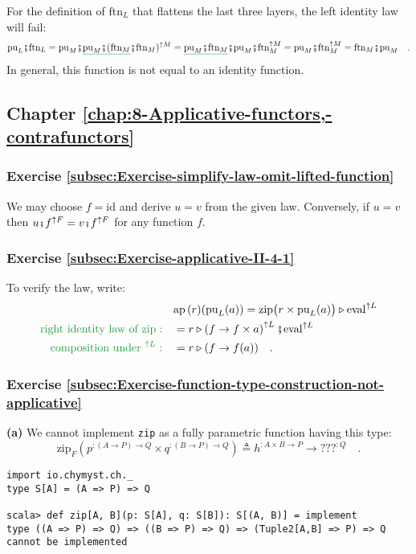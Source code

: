 For the definition of $\text{ftn}_{L}$ that flattens the last three
layers, the left identity law will fail:
\[
\text{pu}_{L}\bef\text{ftn}_{L}=\text{pu}_{M}\bef\gunderline{\text{pu}_{M}\bef(\text{ftn}_{M}}\bef\text{ftn}_{M})^{\uparrow M}=\gunderline{\text{pu}_{M}\bef\text{ftn}_{M}}\bef\text{pu}_{M}\bef\text{ftn}_{M}^{\uparrow M}=\text{pu}_{M}\bef\text{ftn}_{M}^{\uparrow M}=\text{ftn}_{M}\bef\text{pu}_{M}\quad.
\]
In general, this function is not equal to an identity function.

\subsection*{Chapter \ref{chap:8-Applicative-functors,-contrafunctors}}

\subsubsection*{Exercise \ref{subsec:Exercise-simplify-law-omit-lifted-function}}

We may choose $f=\text{id}$ and derive $u=v$ from the given law.
Conversely, if $u=v$ then $u\bef f^{\uparrow F}=v\bef f^{\uparrow F}$
for any function $f$.

\subsubsection*{Exercise \ref{subsec:Exercise-applicative-II-4-1}}

To verify the law, write:
\begin{align*}
 & \text{ap}\,(r)(\text{pu}_{L}(a))=\text{zip}\big(r\times\text{pu}_{L}(a)\big)\triangleright\text{eval}^{\uparrow L}\\
{\color{greenunder}\text{right identity law of }\text{zip}:}\quad & =r\triangleright\left(f\rightarrow f\times a\right)^{\uparrow L}\bef\text{eval}^{\uparrow L}\\
{\color{greenunder}\text{composition under }^{\uparrow L}:}\quad & =r\triangleright(f\rightarrow f(a))\quad.
\end{align*}


\subsubsection*{Exercise \ref{subsec:Exercise-function-type-construction-not-applicative}}

\textbf{(a)} We cannot implement \lstinline!zip! as a fully parametric
function having this type:
\[
\text{zip}_{F}(p^{:(A\rightarrow P)\rightarrow Q}\times q^{:(B\rightarrow P)\rightarrow Q})\triangleq h^{:A\times B\rightarrow P}\rightarrow\text{???}^{:Q}\quad.
\]
\begin{lstlisting}
import io.chymyst.ch._
type S[A] = (A => P) => Q

scala> def zip[A, B](p: S[A], q: S[B]): S[(A, B)] = implement
type ((A => P) => Q) => ((B => P) => Q) => (Tuple2[A,B] => P) => Q cannot be implemented
\end{lstlisting}

